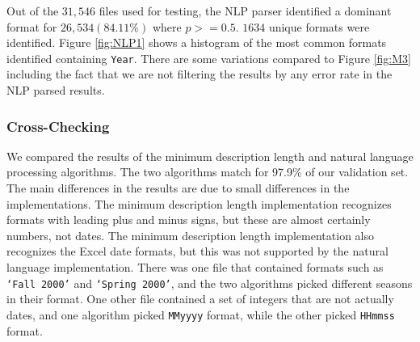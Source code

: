 Out of the $31,546$ files used for testing, the NLP parser identified a dominant format for $26, 534 (84.11\%)$ where $p >= 0.5$. $1634$ unique formats were identified. Figure \ref{fig:NLP1} shows a histogram of the most common formats identified containing \texttt{Year}. There are some variations compared to Figure \ref{fig:M3} including the fact that we are not filtering the results by any error rate in the NLP parsed results.

\subsubsection{Cross-Checking}
We compared the results of the minimum description length and natural language processing algorithms. The two algorithms match for 97.9\% of our validation set. The main differences in the results are due to small differences in the implementations. The minimum description length implementation recognizes formats with leading plus and minus signs, but these are almost certainly numbers, not dates. The minimum description length implementation also recognizes the Excel date formats, but this was not supported by the natural language implementation. There was one file that contained formats such as \texttt{`Fall 2000'} and \texttt{`Spring 2000'}, and the two algorithms picked different seasons in their format. One other file contained a set of integers that are not actually dates, and one algorithm picked \texttt{MMyyyy} format, while the other picked \texttt{HHmmss} format.

